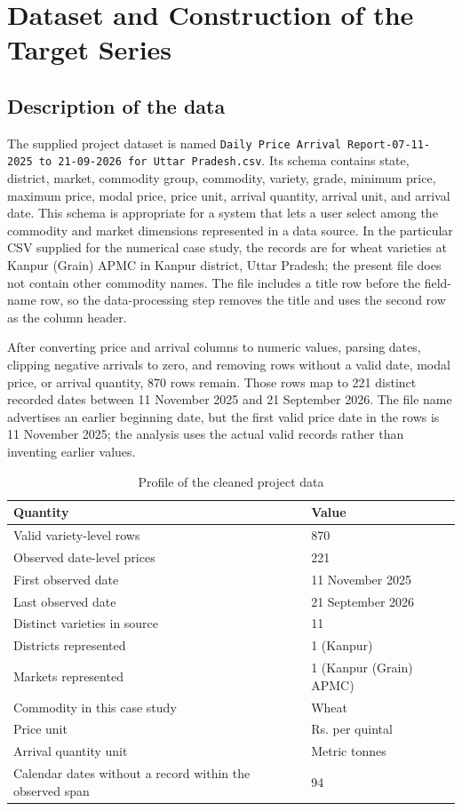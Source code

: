 \documentclass[12pt,a4paper,oneside]{report}
\numberwithin{equation}{chapter}
\numberwithin{figure}{chapter}
\numberwithin{table}{chapter}
\theoremstyle{definition}
\theoremstyle{plain}
\newcommand{\1}{\mathbf{1}}
\begin{document}
\chapter{Dataset and Construction of the Target Series}

\section{Description of the data}
The supplied project dataset \cite{projectdata} is named \texttt{Daily Price Arrival Report-07-11-2025 to 21-09-2026 for Uttar Pradesh.csv}. Its schema contains state, district, market, commodity group, commodity, variety, grade, minimum price, maximum price, modal price, price unit, arrival quantity, arrival unit, and arrival date. This schema is appropriate for a system that lets a user select among the commodity and market dimensions represented in a data source. In the particular CSV supplied for the numerical case study, the records are for wheat varieties at Kanpur (Grain) APMC in Kanpur district, Uttar Pradesh; the present file does not contain other commodity names. The file includes a title row before the field-name row, so the data-processing step removes the title and uses the second row as the column header.

After converting price and arrival columns to numeric values, parsing dates, clipping negative arrivals to zero, and removing rows without a valid date, modal price, or arrival quantity, 870 rows remain. Those rows map to 221 distinct recorded dates between 11 November 2025 and 21 September 2026. The file name advertises an earlier beginning date, but the first valid price date in the rows is 11 November 2025; the analysis uses the actual valid records rather than inventing earlier values.

\begin{table}[H]
\centering
\caption{Profile of the cleaned project data}
\label{tab:datasetprofile}
\begin{tabular}{@{}ll@{}}
\toprule
Quantity & Value \\
\midrule
Valid variety-level rows & 870 \\
Observed date-level prices & 221 \\
First observed date & 11 November 2025 \\
Last observed date & 21 September 2026 \\
Distinct varieties in source & 11 \\
Districts represented & 1 (Kanpur) \\
Markets represented & 1 (Kanpur (Grain) APMC) \\
Commodity in this case study & Wheat \\
Price unit & Rs. per quintal \\
Arrival quantity unit & Metric tonnes \\
Calendar dates without a record within the observed span & 94 \\
\bottomrule
\end{tabular}
\end{table}
\end{document}
